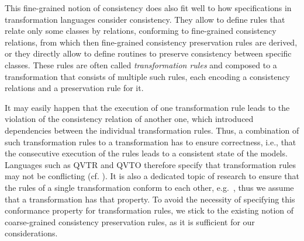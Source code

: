 This fine-grained notion of consistency does also fit well to how specifications in transformation languages consider consistency.
They allow to define rules that relate only some classes by relations, conforming to fine-grained consistency relations, from which then fine-grained consistency preservation rules are derived, or they directly allow to define routines to preserve consistency between specific classes.
These rules are often called \emph{transformation rules} and composed to a transformation that consists of multiple such rules, each encoding a consistency relations and a preservation rule for it.

It may easily happen that the execution of one transformation rule leads to the violation of the consistency relation of another one, which introduced dependencies between the individual transformation rules.
Thus, a combination of such transformation rules to a transformation has to ensure correctness, i.e., that the consecutive execution of the rules leads to a consistent state of the models.
Languages such as \gls{QVTR} and \gls{QVTO} therefore specify that transformation rules may not be conflicting (cf. \cite[7.10.2.]{qvt}).
It is also a dedicated topic of research to ensure that the rules of a single transformation conform to each other, e.g.\ \cite{cuadrado2017tse,cabot2010jss}, thus we assume that a transformation has that property.
To avoid the necessity of specifying this conformance property for transformation rules, we stick to the existing notion of coarse-grained consistency preservation rules, as it is sufficient for our considerations.

